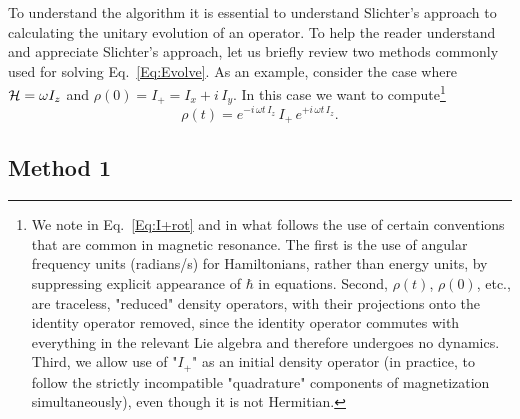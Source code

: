 
To understand the  algorithm it is essential to understand Slichter's approach to calculating the unitary evolution of an operator.  To help the reader understand and appreciate Slichter's approach, let us briefly review two methods commonly used for solving Eq.~\ref{Eq:Evolve}.  As an example, consider the case where ${\cal H} = \omega I_z$ and $\rho(0) = I_{+} = I_x + i \, I_y$.  In this case we want to compute\footnote{We note in Eq.~\ref{Eq:I+rot} and in what follows the use of certain conventions that are common in magnetic resonance. The first is the use of angular frequency units (radians/s) for Hamiltonians, rather than energy units, by suppressing explicit appearance of $\hbar$ in equations. Second, $\rho(t)$, $\rho(0)$, etc., are traceless, "reduced" density operators, with their projections onto the identity operator removed, since the identity operator commutes with everything in the relevant Lie algebra and therefore undergoes no dynamics. Third, we allow use of "$I_+$" as an initial density operator (in practice, to follow the strictly incompatible "quadrature" components of magnetization simultaneously), even though it is not Hermitian.}
\begin{equation}
\rho(t) 
	= e^{-i \, \omega t \, I_z} \, I_{+} \, e^{+i \, \omega t \, I_z}.
	\label{Eq:I+rot}
\end{equation}


\subsection{Method 1}

